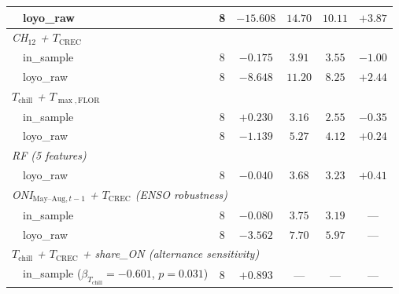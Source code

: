 \begin{table}[H]
\begin{tabular}{llccccc}
 & loyo\_raw       & 8 & $-15.608$ & $14.70$ & $10.11$ & $+3.87$ \\
\midrule
\multicolumn{7}{l}{\textit{CH$_{12}$ + $T_{\text{CREC}}$}} \\
 & in\_sample      & 8 & $-0.175$ & $3.91$ & $3.55$ & $-1.00$ \\
 & loyo\_raw       & 8 & $-8.648$ & $11.20$ & $8.25$ & $+2.44$ \\
\midrule
\multicolumn{7}{l}{\textit{$T_{\text{chill}}$ + $T_{\max,\text{FLOR}}$}} \\
 & in\_sample      & 8 & $+0.230$ & $3.16$ & $2.55$ & $-0.35$ \\
 & loyo\_raw       & 8 & $-1.139$ & $5.27$ & $4.12$ & $+0.24$ \\
\midrule
\multicolumn{7}{l}{\textit{RF (5 features)}} \\
 & loyo\_raw       & 8 & $-0.040$ & $3.68$ & $3.23$ & $+0.41$ \\
\midrule
\multicolumn{7}{l}{\textit{ONI$_{\text{May--Aug},t-1}$ + $T_{\text{CREC}}$ (ENSO robustness)}} \\
 & in\_sample      & 8 & $-0.080$ & $3.75$ & $3.19$ & --- \\
 & loyo\_raw       & 8 & $-3.562$ & $7.70$ & $5.97$ & --- \\
\midrule
\multicolumn{7}{l}{\textit{$T_{\text{chill}}$ + $T_{\text{CREC}}$ + share\_ON (alternance sensitivity)}} \\
 & in\_sample ($\beta_{T_{\text{chill}}}=-0.601$, $p=0.031$) & 8 & $+0.893$ & --- & --- & --- \\
\bottomrule
\end{tabular}
\end{table}
